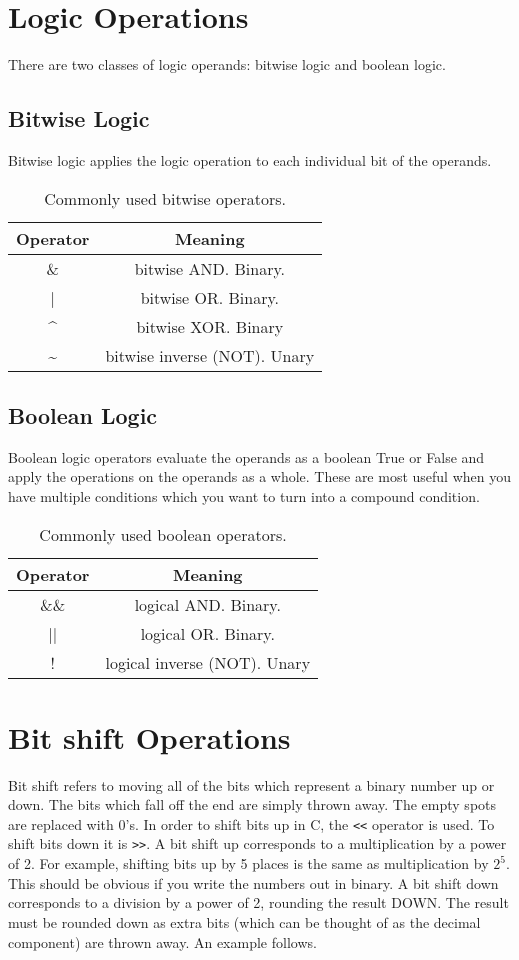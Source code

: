 \section{Logic Operations}
There are two classes of logic operands: bitwise logic and boolean logic. 
\subsection{Bitwise Logic}
Bitwise logic applies the logic operation to each individual bit of the operands. 
\begin{table}[h!]
\centering
\begin{tabu}{c c}
Operator & Meaning \\
\hline
\& & bitwise AND. Binary. \\
| & bitwise OR. Binary. \\
\textasciicircum & bitwise XOR. Binary\\
\textasciitilde & bitwise inverse (NOT). Unary\\
\end{tabu}
\caption{Commonly used bitwise operators.}
\end{table}

\subsection{Boolean Logic}
Boolean logic operators evaluate the operands as a boolean True or False and apply the operations on the operands as a whole.
These are most useful when you have multiple conditions which you want to turn into a compound condition. 
\begin{table}[h!]
\centering
\begin{tabu}{c c}
Operator & Meaning \\
\hline
\&\& & logical AND. Binary. \\
|| & logical OR. Binary. \\
! & logical inverse (NOT). Unary\\
\end{tabu}
\caption{Commonly used boolean operators.}
\end{table}

\section{Bit shift Operations}
Bit shift refers to moving all of the bits which represent a binary number up or down. 
The bits which fall off the end are simply thrown away. 
The empty spots are replaced with 0's. 
In order to shift bits up in C, the \verb|<<| operator is used. To shift bits down it is \verb|>>|. 
A bit shift up corresponds to a multiplication by a power of 2. For example, shifting bits up by 5 places is the same as multiplication by $2^5$.
This should be obvious if you write the numbers out in binary.
A bit shift down corresponds to a division by a power of 2, rounding the result DOWN. The result must be rounded down as extra bits (which can be thought of as the decimal component) are thrown away.
An example follows.


